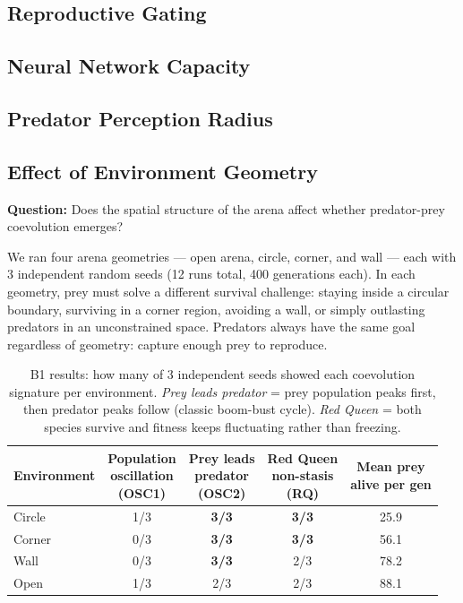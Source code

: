 \documentclass[11pt]{article}
\begin{document}
\subsection{Reproductive Gating}                        %
\subsection{Neural Network Capacity}                    %
\subsection{Predator Perception Radius}                 %
\subsection{Effect of Environment Geometry}             %

\textbf{Question:} Does the spatial structure of the arena affect whether predator-prey
coevolution emerges?

We ran four arena geometries — open arena, circle, corner, and wall — each with 3 independent
random seeds (12 runs total, 400 generations each).
In each geometry, prey must solve a different survival challenge: staying inside a circular
boundary, surviving in a corner region, avoiding a wall, or simply outlasting predators in an
unconstrained space.
Predators always have the same goal regardless of geometry: capture enough prey to reproduce.

\begin{table}[H]
\centering
\caption{B1 results: how many of 3 independent seeds showed each coevolution signature per
environment. \emph{Prey leads predator} = prey population peaks first, then predator peaks
follow (classic boom-bust cycle). \emph{Red Queen} = both species survive and fitness keeps
fluctuating rather than freezing.}
\label{tab:b1}
\begin{tabular}{lcccc}
\toprule
Environment & \shortstack{Population\\oscillation\\(OSC1)} & \shortstack{Prey leads\\predator\\(OSC2)} & \shortstack{Red Queen\\non-stasis\\(RQ)} & \shortstack{Mean prey\\alive per gen} \\
\midrule
Circle  & 1/3 & \textbf{3/3} & \textbf{3/3} & 25.9 \\
Corner  & 0/3 & \textbf{3/3} & \textbf{3/3} & 56.1 \\
Wall    & 0/3 & \textbf{3/3} & 2/3          & 78.2 \\
Open    & 1/3 & 2/3          & 2/3          & 88.1 \\
\bottomrule
\end{tabular}
\end{table}
\end{document}
